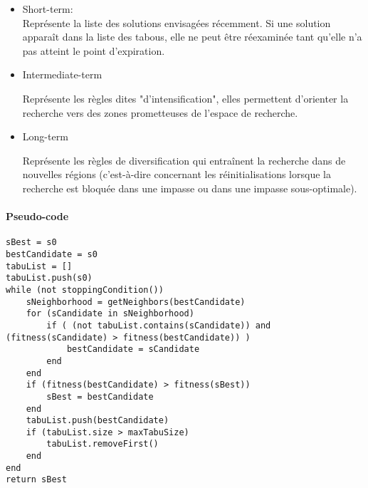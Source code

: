 \begin{itemize}
    \item Short-term: \\ 
    
    \indent     Représente la liste des solutions envisagées récemment. Si une solution apparaît dans la liste des tabous, elle ne peut être réexaminée tant qu'elle n'a pas atteint le point d'expiration. \\
      
    \item{Intermediate-term}
    
    Représente les règles dites "d'intensification", elles permettent d'orienter la recherche vers des zones prometteuses de l'espace de recherche.
    
    \item{Long-term}
    
    Représente les règles de diversification qui entraînent la recherche dans de nouvelles régions (c'est-à-dire concernant les réinitialisations lorsque la recherche est bloquée dans une impasse ou dans une impasse sous-optimale).
\end{itemize}

\newpage
\paragraph{Pseudo-code}

\centering

\begin{lstlisting}
sBest = s0
bestCandidate = s0
tabuList = []
tabuList.push(s0)
while (not stoppingCondition())
	sNeighborhood = getNeighbors(bestCandidate)
	for (sCandidate in sNeighborhood)
		if ( (not tabuList.contains(sCandidate)) and (fitness(sCandidate) > fitness(bestCandidate)) )
			bestCandidate = sCandidate
		end
	end
	if (fitness(bestCandidate) > fitness(sBest))
		sBest = bestCandidate
	end
	tabuList.push(bestCandidate)
	if (tabuList.size > maxTabuSize)
		tabuList.removeFirst()
	end
end
return sBest
\end{lstlisting}

\newpage
